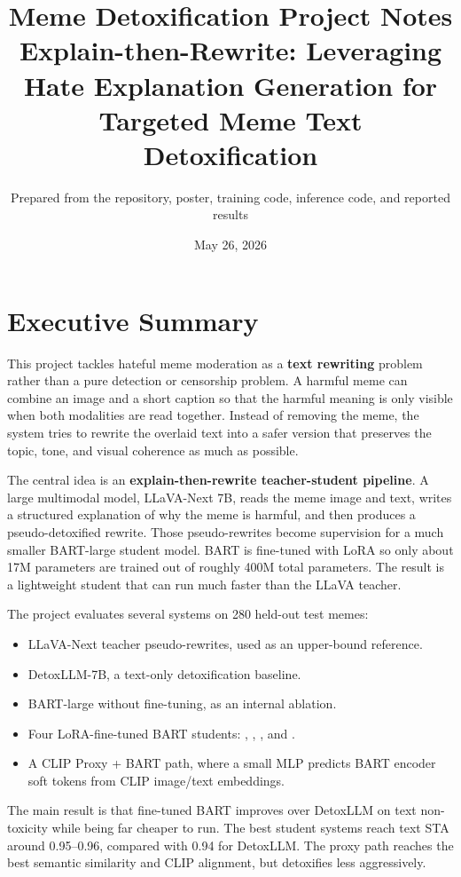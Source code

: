 \documentclass[11pt,a4paper]{article}
\title{\textbf{Meme Detoxification Project Notes}\\
\large Explain-then-Rewrite: Leveraging Hate Explanation Generation for Targeted Meme Text Detoxification}
\author{Prepared from the repository, poster, training code, inference code, and reported results}
\date{May 26, 2026}
\newcommand{\code}[1]{\texttt{\detokenize{#1}}}
\begin{document}
\maketitle
\tableofcontents
\newpage

\section{Executive Summary}

This project tackles hateful meme moderation as a \textbf{text rewriting} problem rather than a pure detection or censorship problem. A harmful meme can combine an image and a short caption so that the harmful meaning is only visible when both modalities are read together. Instead of removing the meme, the system tries to rewrite the overlaid text into a safer version that preserves the topic, tone, and visual coherence as much as possible.

The central idea is an \textbf{explain-then-rewrite teacher-student pipeline}. A large multimodal model, LLaVA-Next 7B, reads the meme image and text, writes a structured explanation of why the meme is harmful, and then produces a pseudo-detoxified rewrite. Those pseudo-rewrites become supervision for a much smaller BART-large student model. BART is fine-tuned with LoRA so only about 17M parameters are trained out of roughly 400M total parameters. The result is a lightweight student that can run much faster than the LLaVA teacher.

The project evaluates several systems on 280 held-out test memes:

\begin{itemize}
  \item LLaVA-Next teacher pseudo-rewrites, used as an upper-bound reference.
  \item DetoxLLM-7B, a text-only detoxification baseline.
  \item BART-large without fine-tuning, as an internal ablation.
  \item Four LoRA-fine-tuned BART students: \code{full}, \code{target_only}, \code{visual_only}, and \code{none}.
  \item A CLIP Proxy + BART path, where a small MLP predicts BART encoder soft tokens from CLIP image/text embeddings.
\end{itemize}

The main result is that fine-tuned BART improves over DetoxLLM on text non-toxicity while being far cheaper to run. The best student systems reach text STA around 0.95--0.96, compared with 0.94 for DetoxLLM. The proxy path reaches the best semantic similarity and CLIP alignment, but detoxifies less aggressively.
\end{document}
